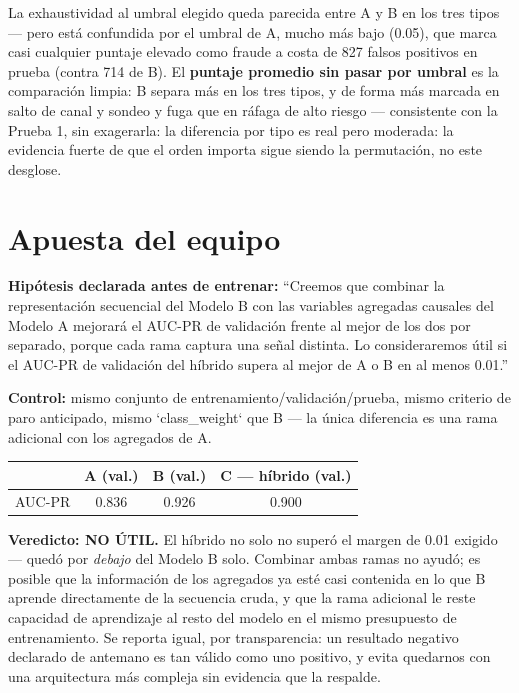 \documentclass[10.5pt]{article}
\begin{document}
La exhaustividad al umbral elegido queda parecida entre A y B en los tres tipos — pero está
confundida por el umbral de A, mucho más bajo (0.05), que marca casi cualquier puntaje elevado como
fraude a costa de 827 falsos positivos en prueba (contra 714 de B). El \textbf{puntaje promedio sin
pasar por umbral} es la comparación limpia: B separa más en los tres tipos, y de forma más marcada
en salto de canal y sondeo y fuga que en ráfaga de alto riesgo — consistente con la Prueba 1, sin
exagerarla: la diferencia por tipo es real pero moderada: la evidencia fuerte de que el orden importa
sigue siendo la permutación, no este desglose.

\section{Apuesta del equipo}

\textbf{Hipótesis declarada antes de entrenar:} ``Creemos que combinar la representación secuencial
del Modelo B con las variables agregadas causales del Modelo A mejorará el AUC-PR de validación
frente al mejor de los dos por separado, porque cada rama captura una señal distinta. Lo
consideraremos útil si el AUC-PR de validación del híbrido supera al mejor de A o B en al menos
0.01.''

\textbf{Control:} mismo conjunto de entrenamiento/validación/prueba, mismo criterio de paro
anticipado, mismo `class\_weight` que B — la única diferencia es una rama adicional con los
agregados de A.

\begin{center}
\begin{tabular}{lccc}
\toprule
 & A (val.) & B (val.) & C — híbrido (val.) \\
\midrule
AUC-PR & 0.836 & 0.926 & 0.900 \\
\bottomrule
\end{tabular}
\end{center}

\textbf{Veredicto: NO ÚTIL.} El híbrido no solo no superó el margen de 0.01 exigido — quedó por
\emph{debajo} del Modelo B solo. Combinar ambas ramas no ayudó; es posible que la información de los
agregados ya esté casi contenida en lo que B aprende directamente de la secuencia cruda, y que la
rama adicional le reste capacidad de aprendizaje al resto del modelo en el mismo presupuesto de
entrenamiento. Se reporta igual, por transparencia: un resultado negativo declarado de antemano es
tan válido como uno positivo, y evita quedarnos con una arquitectura más compleja sin evidencia que
la respalde.
\end{document}
